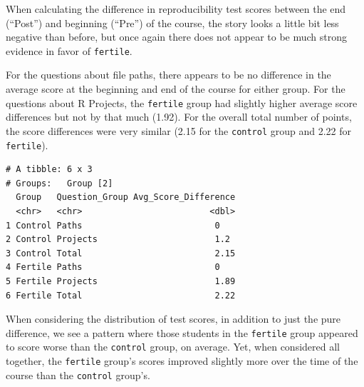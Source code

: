 \documentclass[12pt,twoside]{reedthesis}
\begin{document}
When calculating the difference in reproducibility test scores between the end (``Post'') and beginning (``Pre'') of the course, the story looks a little bit less negative than before, but once again there does not appear to be much strong evidence in favor of \texttt{fertile}.

For the questions about file paths, there appears to be no difference in the average score at the beginning and end of the course for either group. For the questions about R Projects, the \texttt{fertile} group had slightly higher average score differences but not by that much (1.92). For the overall total number of points, the score differences were very similar (2.15 for the \texttt{control} group and 2.22 for \texttt{fertile}).
\begin{verbatim}
# A tibble: 6 x 3
# Groups:   Group [2]
  Group   Question_Group Avg_Score_Difference
  <chr>   <chr>                         <dbl>
1 Control Paths                          0   
2 Control Projects                       1.2 
3 Control Total                          2.15
4 Fertile Paths                          0   
5 Fertile Projects                       1.89
6 Fertile Total                          2.22
\end{verbatim}
When considering the distribution of test scores, in addition to just the pure difference, we see a pattern where those students in the \texttt{fertile} group appeared to score worse than the \texttt{control} group, on average. Yet, when considered all together, the \texttt{fertile} group's scores improved slightly more over the time of the course than the \texttt{control} group's.
\end{document}
